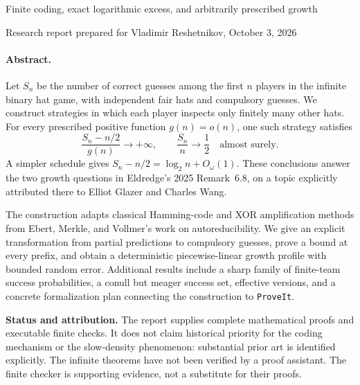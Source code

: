 \documentclass[11pt,letterpaper]{article}
\theoremstyle{definition}
\newcommand{\repo}{\texttt{ProveIt}}
\begin{document}
\setcounter{section}{16}
\renewcommand{\thesection}{\arabic{section}}
\renewcommand{\theHsection}{hat.\arabic{section}}
\makeatletter\gdef\Hy@chapapp{\Hy@chapterstring}\makeatother

{\large Finite coding, exact logarithmic excess, and arbitrarily prescribed growth\par}
\smallskip
{Research report prepared for Vladimir Reshetnikov, October 3, 2026\par}

\paragraph{Abstract.}
Let \(S_n\) be the number of correct guesses among the first \(n\) players
in the infinite binary hat game, with independent fair hats and compulsory
guesses. We construct strategies in which each player inspects only
finitely many other hats. For every prescribed positive function
\(g(n)=o(n)\), one such strategy satisfies
\[
  \frac{S_n-n/2}{g(n)}\longrightarrow+\infty,
  \qquad \frac{S_n}{n}\longrightarrow\frac12
  \quad\text{almost surely}.
\]
A simpler schedule gives \(S_n-n/2=\log_2 n+O_\omega(1)\).
These conclusions answer the two growth questions in
Eldredge's 2025 Remark~6.8, on a topic explicitly attributed there to
Elliot Glazer and Charles Wang.

The construction adapts classical Hamming-code and XOR amplification
methods from Ebert, Merkle, and Vollmer's work on autoreducibility.
We give an explicit transformation from partial predictions to compulsory
guesses, prove a bound at every prefix, and obtain a deterministic
piecewise-linear growth profile with bounded random error. Additional
results include a sharp family of finite-team success probabilities,
a conull but meager success set, effective versions, and a concrete
formalization plan connecting the construction to \repo.

\begin{resultbox}
\textbf{Status and attribution.}
The report supplies complete mathematical proofs and executable finite
checks. It does not claim historical priority for the coding mechanism
or the slow-density phenomenon: substantial prior art is identified
explicitly. The infinite theorems have not been verified by a proof
assistant. The finite checker is supporting evidence, not a substitute
for their proofs.
\end{resultbox}
\end{document}
